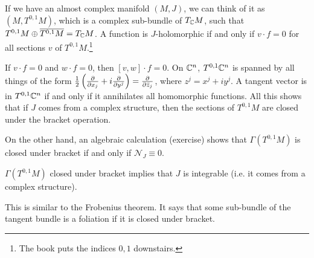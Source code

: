  If we have an almost complex manifold $(M,J)$, we can think of it
 as $(M,T^{0,1}M)$, which is a complex sub-bundle of $T_{\mathbb{C}} M$,
 such that $T^{0,1}M\oplus \overline{T^{0,1}M} = T_{\mathbb{C}} M$.  A
 function is $J$-holomorphic if and only if $v\cdot f=0$ for all
 sections $v$ of $T^{0,1}M$.\footnote{The book puts the indices $0,1$ downstairs.}

 If $v\cdot f=0$ and $w\cdot f=0$, then $[v,w]\cdot f=0$.  On
 $\mathbb{C}^n$, $T^{0,1}\mathbb{C}^n$ is spanned by all things of the form
 $\frac{1}{2}\left(\frac{\partial }{\partial x_j}+i\frac{\partial }{\partial y^j}\right) =
 \frac{\partial }{\partial \bar z_j}$, where $z^j = x^j+iy^j$.  A tangent vector is
 in $T^{0,1}\mathbb{C}^n$ if and only if it annihilates all homomorphic
 functions.  All this shows that if $J$ comes from a complex
 structure, then the sections of $T^{0,1}M$ are closed under the
 bracket operation.

 On the other hand, an algebraic calculation (exercise) shows that
 $\Gamma(T^{0,1}M)$ is closed under bracket if and only if
 $\mathcal{N}_J\equiv 0$.

 \begin{theorem}
   $\Gamma(T^{0,1}M)$ closed under bracket implies that $J$ is
   integrable (i.e. it comes from a complex structure).
 \end{theorem}

 This is similar to the Frobenius theorem.  It says that some
 sub-bundle of the tangent bundle is a foliation if it is closed
 under bracket.
